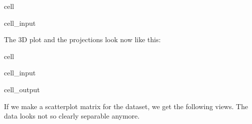 \documentclass[letterpaper,10pt,english]{jupyterBook}
\begin{document}
\begin{sphinxuseclass}{cell}\begin{sphinxVerbatimInput}

\begin{sphinxuseclass}{cell_input}
\begin{sphinxVerbatim}[commandchars=\\\{\}]
     
   
   \PYG{p}{[}  \PYG{p}{]} 
  
\end{sphinxVerbatim}

\end{sphinxuseclass}\end{sphinxVerbatimInput}

\end{sphinxuseclass}
\sphinxAtStartPar
The 3D plot and the projections look now like this:

\begin{sphinxuseclass}{cell}\begin{sphinxVerbatimInput}

\begin{sphinxuseclass}{cell_input}
\begin{sphinxVerbatim}[commandchars=\\\{\}]
\end{sphinxVerbatim}

\end{sphinxuseclass}\end{sphinxVerbatimInput}
\begin{sphinxVerbatimOutput}

\begin{sphinxuseclass}{cell_output}
\noindent{}

\end{sphinxuseclass}\end{sphinxVerbatimOutput}

\end{sphinxuseclass}
\sphinxAtStartPar
If we make a scatterplot matrix for the dataset, we get the following views. The data looks not so clearly separable anymore.
\end{document}
